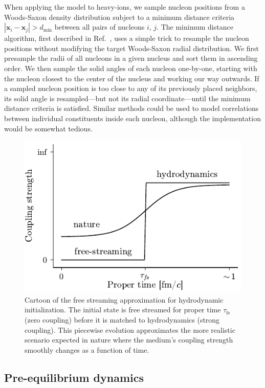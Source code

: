 \documentclass[aps,prc,reprint,amsmath,nofootinbib]{revtex4-1}
\newcommand{\taufs}{\tau_\text{fs}}
\newcommand{\xv}{\mathbf x}
\begin{document}
When applying the model to heavy-ions, we sample nucleon positions from a Woods-Saxon density distribution subject to a minimum distance criteria $|\xv_i - \xv_j| > d_\mathrm{min}$ between all pairs of nucleons $i$, $j$.
The minimum distance algorithm, first described in Ref.~\cite{Bernhard:2018hnz}, uses a simple trick to resample the nucleon positions without modifying the target Woods-Saxon radial distribution.
We first presample the radii of all nucleons in a given nucleus and sort them in ascending order.
We then sample the solid angles of each nucleon one-by-one, starting with the nucleon closest to the center of the nucleus and working our way outwards.
If a sampled nucleon position is too close to any of its previously placed neighbors, its solid angle is resampled---but not its radial coordinate---until the minimum distance criteria is satisfied.
Similar methods could be used to model correlations between individual constituents inside each nucleon, although the implementation would be somewhat tedious.

\begin{figure}
  \includegraphics{coupling}
  \caption{Cartoon of the free streaming approximation for hydrodynamic initialization. The initial state is free streamed for proper time $\taufs$ (zero coupling) before it is matched to hydrodynamics (strong coupling). This piecewise evolution approximates the more realistic scenario expected in nature where the medium's coupling strength smoothly changes as a function of time.}
  \label{fig:coupling}
\end{figure}

\subsection{Pre-equilibrium dynamics}
\end{document}
